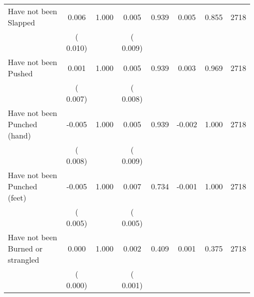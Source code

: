 \begin{tabular}{l*{7}{c}}
 Have not been Slapped       &              0.006       &        1.000  &              0.005       &        0.939  &              0.005       &              0.855 &  2718 \\ 
                       &       (       0.010)             &                               &       (       0.009)                     &                               &                                               &                                &                      \\ 

 Have not been Pushed       &              0.001       &        1.000  &              0.005       &        0.939  &              0.003       &              0.969 &  2718 \\ 
                       &       (       0.007)             &                               &       (       0.008)                     &                               &                                               &                                &                      \\ 

 Have not been Punched (hand)       &             -0.005       &        1.000  &              0.005       &        0.939  &             -0.002       &              1.000 &  2718 \\ 
                       &       (       0.008)             &                               &       (       0.009)                     &                               &                                               &                                &                      \\ 

 Have not been Punched (feet)       &             -0.005       &        1.000  &              0.007       &        0.734  &             -0.001       &              1.000 &  2718 \\ 
                       &       (       0.005)             &                               &       (       0.005)                     &                               &                                               &                                &                      \\ 

 Have not been Burned or strangled       &              0.000       &        1.000  &              0.002       &        0.409  &              0.001       &              0.375 &  2718 \\ 
                       &       (       0.000)             &                               &       (       0.001)                     &                               &                                               &                                &                      \\ 


\end{tabular}

